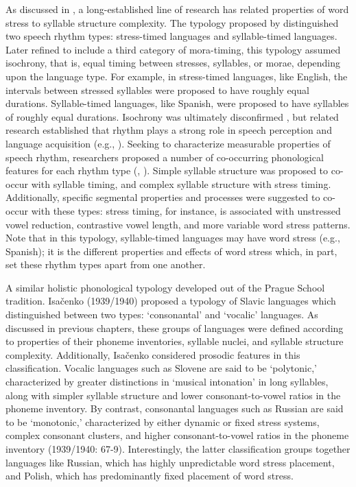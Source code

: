   As discussed in , a long-established line of research has related properties of word stress to syllable structure complexity. The typology proposed by \citet{Pike1945} distinguished two speech rhythm types: stress-timed languages and syllable-timed languages. Later refined to include a third category of mora-timing, this typology assumed isochrony, that is, equal timing between stresses, syllables, or morae, depending upon the language type. For example, in stress-timed languages, like English, the intervals between stressed syllables were proposed to have roughly equal durations. Syllable-timed languages, like Spanish, were proposed to have syllables of roughly equal durations. Isochrony was ultimately disconfirmed \citep{Roach1982}, but related research established that rhythm plays a strong role in speech perception and language acquisition (e.g., \citealt{CutlerMehler1993}). Seeking to characterize measurable properties of speech rhythm, researchers proposed a number of co-occurring phonological features for each rhythm type (\citealt{Dauer1983}, \citealt{Auer1993}). Simple syllable structure was proposed to co-occur with syllable timing, and complex syllable structure with stress timing. Additionally, specific segmental properties and processes were suggested to co-occur with these types: stress timing, for instance, is associated with unstressed vowel reduction, contrastive vowel length, and more variable word stress patterns. Note that in this typology, syllable-timed languages may have word stress (e.g., Spanish); it is the different properties and effects of word stress which, in part, set these rhythm types apart from one another.



  A similar holistic phonological typology developed out of the Prague School tradition. Isačenko (1939/1940) proposed a typology of Slavic languages which distinguished between two types: ‘consonantal’ and ‘vocalic’ languages. As discussed in previous chapters, these groups of languages were defined according to properties of their phoneme inventories, syllable nuclei, and syllable structure complexity. Additionally, Isačenko considered prosodic features in this classification. Vocalic languages such as Slovene are said to be ‘polytonic,’ characterized by greater distinctions in ‘musical intonation’ in long syllables, along with simpler syllable structure and lower consonant-to-vowel ratios in the phoneme inventory. By contrast, consonantal languages such as Russian are said to be ‘monotonic,’ characterized by either dynamic or fixed stress systems, complex consonant clusters, and higher consonant-to-vowel ratios in the phoneme inventory (1939/1940: 67-9). Interestingly, the latter classification groups together languages like Russian, which has highly unpredictable word stress placement, and Polish, which has predominantly fixed placement of word stress.



